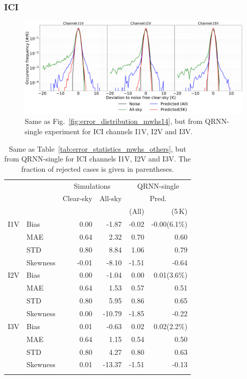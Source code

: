 \documentclass[amt, manuscript]{copernicus}
\begin{document}
\subsubsection{ICI}
%
\begin{figure}[t]
	\includegraphics[width=\textwidth]{Figures/error_distribution_QRNN-single.pdf} 
	\caption{Same as Fig.~\ref{fig:error_distribution_mwhs14}, but from QRNN-single experiment for ICI channels I1V, I2V and I3V. }
	\label{fig:error_distributions}	
\end{figure}
\begin{table}[t]
	\caption{ Same as Table~\ref{tab:error_statistics_mwhs_others}, but from QRNN-single for ICI channels I1V, I2V and I3V. The fraction of rejected cases is given in parentheses.}
	\label{tab:error_statistics_ici}
	\begin{tabular}{llrr|rr}
		\tophline
		&&\multicolumn{2}{c|}{Simulations}& \multicolumn{2}{c}{QRNN-single} \\
		\cline{3-6}
		&&Clear-sky &   All-sky &  \multicolumn{2}{c}{Pred.}  \\
		&&			   &			&	(All) & (5\,K) \\
		\middlehline
		
		I1V&  Bias      &  0.00 & -1.87 & -0.02 & -0.00(6.1\%)  \\
		&MAE       		&  0.64 &  2.32 &  0.70 &  0.60   \\
		&STD       		&  0.80 &  8.84 &  1.06 &  0.79   \\
		&Skewness 		& -0.01 & -8.10 & -1.51 & -0.64  \\
		\middlehline
		I2V & Bias      & 0.00 &  -1.04 &  0.00 &  0.01(3.6\%)  \\
		&MAE       		& 0.64 &   1.53 &  0.57 &  0.51 \\
		&STD       		& 0.80 &   5.95 &  0.86 &  0.65 \\
		&Skewness 		& 0.00 & -10.79 & -1.85 & -0.22  \\
		\middlehline	
		I3V & Bias      & 0.01 &  -0.63 &  0.02 &  0.02(2.2\%)  \\
		&MAE       		& 0.64 &   1.15 &  0.54 &  0.50  \\
		&STD       		& 0.80 &   4.27 &  0.80 &  0.63  \\
		&Skewness 		& 0.01 & -13.37 & -1.51 & -0.13  \\
		\bottomhline
	\end{tabular}
	\belowtable{} %
\end{table}
\end{document}
